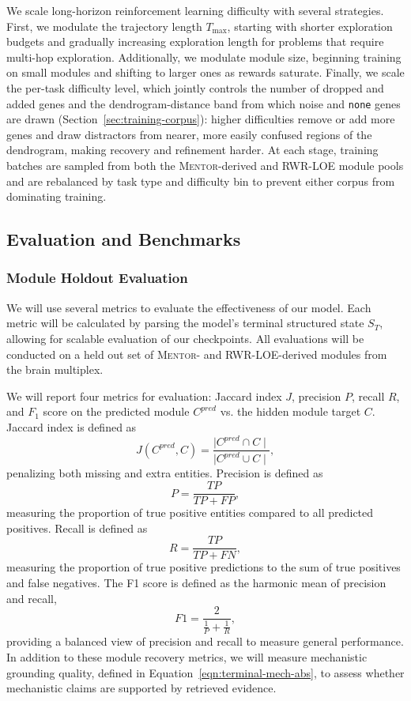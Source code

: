 \documentclass[thesis,letterpaper,12pt]{utthesis}
\begin{document}
We scale long-horizon reinforcement learning difficulty with several strategies. First, we modulate the trajectory length $T_{\max}$, starting with shorter exploration budgets and gradually increasing exploration length for problems that require multi-hop exploration. Additionally, we modulate module size, beginning training on small modules and shifting to larger ones as rewards saturate. Finally, we scale the per-task difficulty level, which jointly controls the number of dropped and added genes and the dendrogram-distance band from which noise and \texttt{none} genes are drawn (Section~\ref{sec:training-corpus}): higher difficulties remove or add more genes and draw distractors from nearer, more easily confused regions of the dendrogram, making recovery and refinement harder. At each stage, training batches are sampled from both the \textsc{Mentor}-derived and RWR-LOE module pools and are rebalanced by task type and difficulty bin to prevent either corpus from dominating training.

\subsection{Evaluation and Benchmarks}\label{sec:eval}
\subsubsection{Module Holdout Evaluation}
We will use several metrics to evaluate the effectiveness of our model. Each metric will be calculated by parsing the model's terminal structured state $S_T$, allowing for scalable evaluation of our checkpoints. All evaluations will be conducted on a held out set of \textsc{Mentor}- and RWR-LOE-derived modules from the brain multiplex.

We will report four metrics for evaluation: Jaccard index $J$, precision $P$, recall $R$, and $F_1$ score on the predicted module $C^{pred}$ vs. the hidden module target $C$. Jaccard index is defined as 
\[
    J(C^{pred}, C) = \frac{\mid C^{pred} \cap C \mid}{\mid C^{pred} \cup C \mid},
\]
penalizing both missing and extra entities. Precision is defined as
\[
    P = \frac{TP}{TP + FP},
\]
measuring the proportion of true positive entities compared to all predicted positives. Recall is defined as
\[
    R = \frac{TP}{TP + FN},
\]
measuring the proportion of true positive predictions to the sum of true positives and false negatives. The F1 score is defined as the harmonic mean of precision and recall,
\[
    F1 = \frac{2}{\frac{1}{P} + \frac{1}{R}},
\]
providing a balanced view of precision and recall to measure general performance. In addition to these module recovery metrics, we will measure mechanistic grounding quality, defined in Equation~\ref{eqn:terminal-mech-abs}, to assess whether mechanistic claims are supported by retrieved evidence.  
\end{document}
